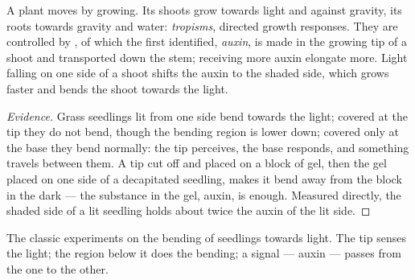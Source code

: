 \begin{proposition}\label{prop:g12:plant-rooted-life:tropisms}
A plant moves by growing. Its shoots grow towards light and against
gravity, its roots towards gravity and water: \emph{tropisms},
directed growth responses. They are controlled by , of which
the first identified, \emph{auxin}, is made in the growing tip of a
shoot and transported down the stem;  receiving more auxin
elongate more. Light falling on one side of a shoot shifts the auxin
to the shaded side, which grows faster and bends the shoot towards the
light.
\end{proposition}
\begin{proof}[Evidence]
Grass seedlings lit from one side bend towards the light; covered at
the tip they do not bend, though the bending region is lower down;
covered only at the base they bend normally: the tip perceives, the
base responds, and something travels between them. A tip cut off and
placed on a block of gel, then the gel placed on one side of a
decapitated seedling, makes it bend away from the block in the dark
--- the substance in the gel, auxin, is enough. Measured directly, the
shaded side of a lit seedling holds about twice the auxin of the lit
side.
\end{proof}

\begin{omfigure}

{\small The classic experiments on the bending of seedlings towards
light. The tip senses the light; the region below it does the
bending; a signal --- auxin --- passes from the one to the other.}
\end{omfigure}

